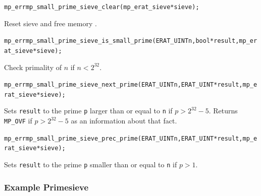 \documentclass[synpaper]{book}
\begin{document}
\begin{alltt}
mp_err mp_small_prime_sieve_clear(mp_erat_sieve *sieve);
\end{alltt}
Reset sieve and free memory .

\begin{alltt}
mp_err mp_small_prime_sieve_is_small_prime(ERAT_UINT n, bool *result, mp_erat_sieve *sieve);
\end{alltt}
Check primality of $n$ if $n < 2^32$.


\begin{alltt}
mp_err mp_small_prime_sieve_next_prime(ERAT_UINT n, ERAT_UINT *result, mp_erat_sieve *sieve);
\end{alltt}
Sets {\texttt{result}} to the prime {\texttt{p}} larger than or equal to {\texttt{n}} if $p > 2^32 - 5$.
Returns {\texttt{MP\_OVF}} if $p > 2^32 - 5$ as an information about that fact.

\begin{alltt}
mp_err mp_small_prime_sieve_prec_prime(ERAT_UINT n, ERAT_UINT *result, mp_erat_sieve *sieve);
\end{alltt}
Sets {\texttt{result}} to the prime {\texttt{p}} smaller than or equal to {\texttt{n}} if $p > 1$.

\subsubsection{Example Primesieve}
\end{document}
